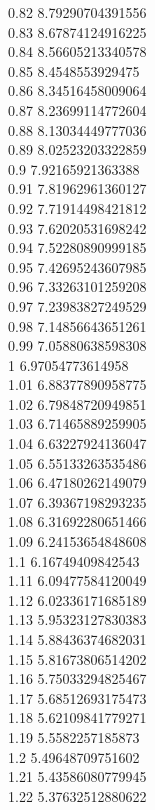 {0.82	8.79290704391556\\
0.83	8.67874124916225\\
0.84	8.56605213340578\\
0.85	8.4548553929475\\
0.86	8.34516458009064\\
0.87	8.23699114772604\\
0.88	8.13034449777036\\
0.89	8.02523203322859\\
0.9	7.92165921363388\\
0.91	7.81962961360127\\
0.92	7.71914498421812\\
0.93	7.62020531698242\\
0.94	7.52280890999185\\
0.95	7.42695243607985\\
0.96	7.33263101259208\\
0.97	7.23983827249529\\
0.98	7.14856643651261\\
0.99	7.05880638598308\\
1	6.97054773614958\\
1.01	6.88377890958775\\
1.02	6.79848720949851\\
1.03	6.71465889259905\\
1.04	6.63227924136047\\
1.05	6.55133263535486\\
1.06	6.47180262149079\\
1.07	6.39367198293235\\
1.08	6.31692280651466\\
1.09	6.24153654848608\\
1.1	6.16749409842543\\
1.11	6.09477584120049\\
1.12	6.02336171685189\\
1.13	5.95323127830383\\
1.14	5.88436374682031\\
1.15	5.81673806514202\\
1.16	5.75033294825467\\
1.17	5.68512693175473\\
1.18	5.62109841779271\\
1.19	5.5582257185873\\
1.2	5.49648709751602\\
1.21	5.43586080779945\\
1.22	5.37632512880622\\
}
